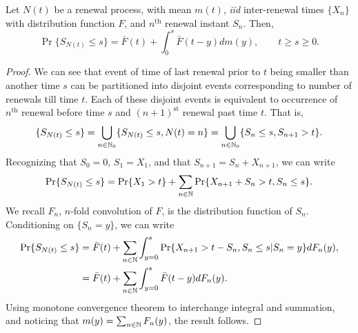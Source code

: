 \documentclass[a4paper,10pt,english]{article}
\begin{document}
\begin{thm} Let $N(t)$ be a renewal process, with mean $m(t)$, \textit{iid} inter-renewal times $\{X_n\}$ with distribution function $F$, and $n^{\mathrm{th}}$ renewal instant $S_n$. Then,
\begin{equation*}
\Pr\{S_{N(t)}\leq s\}=\bar{F}(t)+\int_{0}^{s}\bar{F}(t-y)dm(y),\quad\quad t\geq s \geq 0.
\end{equation*}
\end{thm} 
\begin{proof} We can see that event of time of last renewal prior to $t$ being smaller than another time $s$ can be partitioned into disjoint events corresponding to number of renewals till time $t$. Each of these disjoint events is equivalent to occurrence of $n^{\mathrm{th}}$ renewal before time $s$ and $(n+1)^{\mathrm{st}}$ renewal past time $t$. That is,
\begin{equation*}
	\{S_{N(t)} \leq s\} = \bigcup_{n \in \mathbb{N}_0}\{ S_{N(t)} \leq s, N(t)=n\} = \bigcup_{n \in \mathbb{N}_0}\{ S_n \leq s, S_{n+1} > t\} .
\end{equation*}
Recognizing that $S_0 = 0$, $S_1 = X_1$, and that $S_{n+1} = S_n + X_{n+1}$, we can write
\begin{equation*}
	\Pr\{S_{N(t)} \leq s\} = \Pr\{X_1 > t\} + \sum_{n \in \mathbb{N}}\Pr\{ X_{n+1} + S_n > t, S_n \leq s\} .
\end{equation*}
We recall $F_n$, $n$-fold convolution of $F$, is the distribution function of $S_n$. Conditioning on $\{S_n = y\}$, we can write
\begin{align*}
	\Pr\{S_{N(t)} \leq s\} &= \bar{F}(t) + \sum_{n \in \mathbb{N}}\int_{y=0}^{s}\Pr\{ X_{n+1} > t - S_n, S_n \leq s| S_n = y\}dF_n(y),\\
	&= \bar{F}(t) + \sum_{n \in \mathbb{N}}\int_{y=0}^{s}\bar{F}(t-y)dF_n(y).
\end{align*}
Using monotone convergence theorem to interchange integral and summation, and noticing that $m(y) = \sum_{n\in\mathbb{N}}F_n(y)$, the result follows.
\end{proof}
\end{document}
